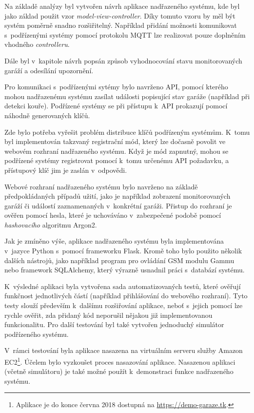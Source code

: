 Na základě analýzy byl vytvořen návrh aplikace nadřazeného systému, kde byl jako základ použit vzor \textit{model-view-controller}. Díky tomuto vzoru by měl být systém poměrně snadno rozšiřitelný. Například přidání možnosti komunikovat s~podřízenými systémy pomocí protokolu MQTT lze realizovat pouze doplněním vhodného \textit{controlleru}.

Dále byl v~kapitole návrh popsán způsob vyhodnocování stavu monitorovaných garáží a odesílání upozornění.

Pro komunikaci s~podřízenými sytémy bylo navrženo API, pomocí kterého mohou nadřazenému systému zasílat události popisující stav garáže (například při detekci kouře). Podřízené systémy se při přístupu k~API prokazují pomocí náhodně generovaných klíčů.

Zde bylo potřeba vyřešit problém distribuce klíčů podřízeným systémům. K~tomu byl implementován takzvaný registrační mód, který lze dočasně povolit ve webovém rozhraní nadřazeného systému. Když je mód zapnutný, mohou se podřízené systémy registrovat pomocí k~tomu určenému API požadavku, a přístupový klíč jim je zaslán v~odpovědi.

Webové rozhraní nadřazeného systému bylo navrženo na základě předpokládaných případů užití, jako je například zobrazení monitorovaných garáží či událostí zaznamenaných v~konkrétní garáži. Přistup do rozhraní je ověřen pomocí hesla, které je uchováváno v~zabezpečené podobě pomocí \textit{hashovacího} algoritmu Argon2.

Jak je zmíněno výše, aplikace nadřazeného systému byla implementována v~jazyce Python s~pomocí frameworku Flask. Kromě toho bylo použito několik dalších nástrojů, jako například program pro ovládání GSM modulu Gammu nebo framework SQLAlchemy, který výrazně usnadnil práci s~databází systému.


K~výsledné aplikaci byla vytvořena sada automatizovaných testů, které ověřují funkčnost jednotlivých částí (například přihlášování do webového rozhraní). Tyto testy slouží především k~dalšímu rozšiřování aplikace, neboť s~jejich pomocí lze rychle ověřit, zda přidaný kód neporušil nějakou již implementovanou funkcionalitu. Pro další testování byl také vytvořen jednoduchý simulátor podřízeného systému.

V~rámci testování byla aplikace nasazena na virtuálním serveru služby Amazon EC2\footnote{Aplikace je do konce června 2018 dostupná na \url{https://demo-garaze.tk}.}. Účelem bylo vyzkoušet proces nasazování aplikace. Nasazenou aplikaci (včetně simulátoru) je také možné použít k~demonstraci funkce nadřazeného systému.

